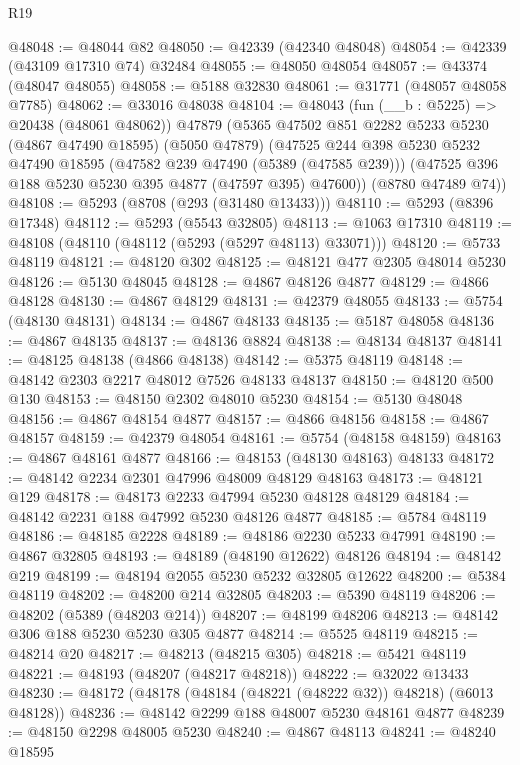 \begin{lexlean}{R19}
\begin{coremodule}
@48048 := @48044 @82
@48050 := @42339 (@42340 @48048)
@48054 := @42339 (@43109 @17310 @74) @32484
@48055 := @48050 @48054
@48057 := @43374 (@48047 @48055)
@48058 := @5188 @32830
@48061 := @31771 (@48057 @48058 @7785)
@48062 := @33016 @48038
@48104 := @48043
    (fun (__b : @5225) => @20438 (@48061 @48062))
    @47879
    (@5365
      @47502
      @851
      @2282
      @5233
      @5230
      (@4867 @47490 @18595)
      (@5050 @47879)
      (@47525
        @244
        @398
        @5230
        @5232
        @47490
        @18595
        (@47582 @239 @47490 (@5389 (@47585 @239)))
        (@47525 @396 @188 @5230 @5230 @395 @4877 (@47597 @395) @47600))
      (@8780 @47489 @74))
@48108 := @5293 (@8708 (@293 (@31480 @13433)))
@48110 := @5293 (@8396 @17348)
@48112 := @5293 (@5543 @32805)
@48113 := @1063 @17310
@48119 := @48108 (@48110 (@48112 (@5293 (@5297 @48113) @33071)))
@48120 := @5733 @48119
@48121 := @48120 @302
@48125 := @48121 @477 @2305 @48014 @5230
@48126 := @5130 @48045
@48128 := @4867 @48126 @4877
@48129 := @4866 @48128
@48130 := @4867 @48129
@48131 := @42379 @48055
@48133 := @5754 (@48130 @48131)
@48134 := @4867 @48133
@48135 := @5187 @48058
@48136 := @4867 @48135
@48137 := @48136 @8824
@48138 := @48134 @48137
@48141 := @48125 @48138 (@4866 @48138)
@48142 := @5375 @48119
@48148 := @48142 @2303 @2217 @48012 @7526 @48133 @48137
@48150 := @48120 @500 @130
@48153 := @48150 @2302 @48010 @5230
@48154 := @5130 @48048
@48156 := @4867 @48154 @4877
@48157 := @4866 @48156
@48158 := @4867 @48157
@48159 := @42379 @48054
@48161 := @5754 (@48158 @48159)
@48163 := @4867 @48161 @4877
@48166 := @48153 (@48130 @48163) @48133
@48172 := @48142 @2234 @2301 @47996 @48009 @48129 @48163
@48173 := @48121 @129
@48178 := @48173 @2233 @47994 @5230 @48128 @48129
@48184 := @48142 @2231 @188 @47992 @5230 @48126 @4877
@48185 := @5784 @48119
@48186 := @48185 @2228
@48189 := @48186 @2230 @5233 @47991
@48190 := @4867 @32805
@48193 := @48189 (@48190 @12622) @48126
@48194 := @48142 @219
@48199 := @48194 @2055 @5230 @5232 @32805 @12622
@48200 := @5384 @48119
@48202 := @48200 @214 @32805
@48203 := @5390 @48119
@48206 := @48202 (@5389 (@48203 @214))
@48207 := @48199 @48206
@48213 := @48142 @306 @188 @5230 @5230 @305 @4877
@48214 := @5525 @48119
@48215 := @48214 @20
@48217 := @48213 (@48215 @305)
@48218 := @5421 @48119
@48221 := @48193 (@48207 (@48217 @48218))
@48222 := @32022 @13433
@48230 := @48172 (@48178 (@48184 (@48221 (@48222 @32)) @48218) (@6013 @48128))
@48236 := @48142 @2299 @188 @48007 @5230 @48161 @4877
@48239 := @48150 @2298 @48005 @5230
@48240 := @4867 @48113
@48241 := @48240 @18595

\end{coremodule}
\end{lexlean}
